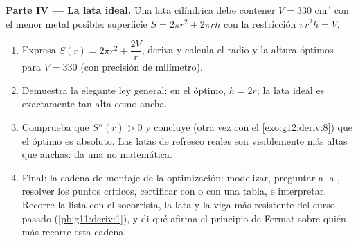 \begin{problem}
\medskip
\noindent\textbf{Parte IV --- La lata ideal.}
Una lata cilíndrica debe contener $V = 330$ cm$^3$ con el menor metal
posible: superficie $S = 2\pi r^2 + 2\pi r h$ con la restricción
$\pi r^2 h = V$.
\begin{enumerate}[resume]
  \item Expresa $S(r) = 2\pi r^2 + \dfrac{2V}{r}$, deriva y calcula el
        radio y la altura óptimos para $V = 330$ (con precisión de
        milímetro).
  \item Demuestra la elegante ley general: en el óptimo, $h = 2r$; la lata
        ideal es exactamente tan alta como ancha.
  \item Comprueba que $S''(r) > 0$ y concluye (otra vez con el
        \cref{exo:g12:deriv:8}) que el óptimo es absoluto. Las latas de
        refresco reales son visiblemente más altas que anchas: da una 
        no matemática.
  \item Final: la cadena de montaje de la optimización: modelizar,
        preguntar a la , resolver los puntos críticos, certificar
        con  o con una tabla, e interpretar. Recorre la lista con
        el socorrista, la lata y la viga más resistente del curso pasado
        (\cref{pb:g11:deriv:1}), y di qué afirma el principio de Fermat
        sobre quién más recorre esta cadena.
\end{enumerate}
\end{problem}
